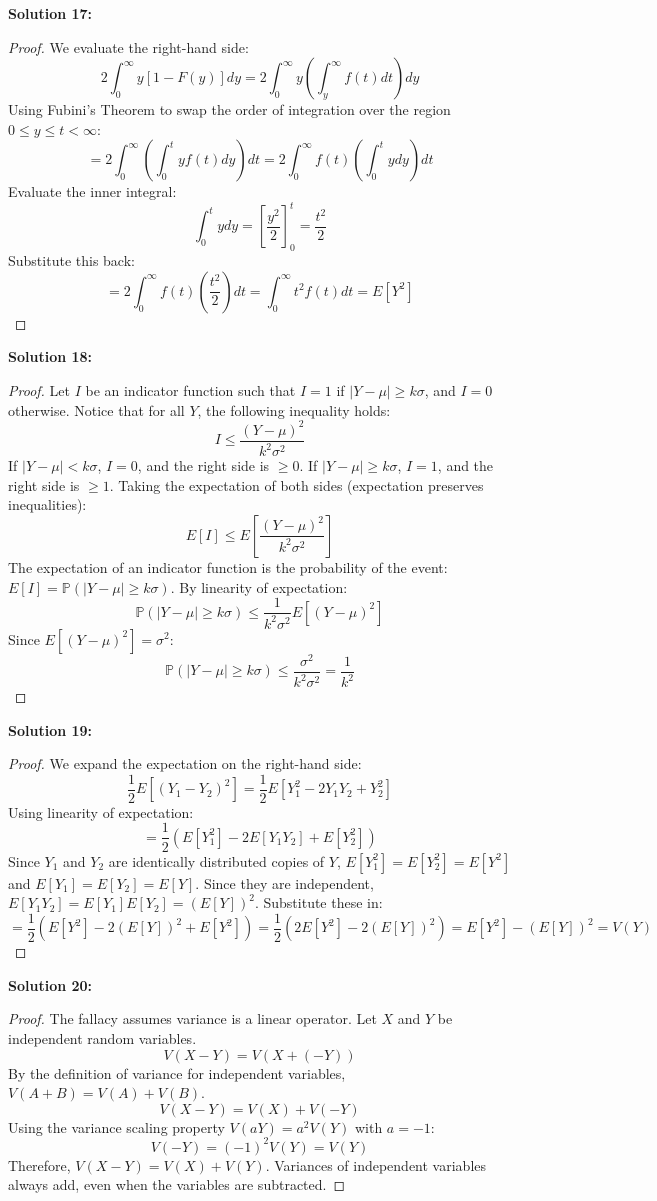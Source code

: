 \documentclass[11pt, a4paper]{article}
\theoremstyle{definition}
\theoremstyle{remark}
\newcommand{\Prob}{\mathbb{P}}
\begin{document}
\textbf{Solution 17:}
\begin{proof}
We evaluate the right-hand side:
\[ 2 \int_0^\infty y [1 - F(y)] dy = 2 \int_0^\infty y \left( \int_y^\infty f(t) dt \right) dy \]
Using Fubini's Theorem to swap the order of integration over the region $0 \le y \le t < \infty$:
\[ = 2 \int_0^\infty \left( \int_0^t y f(t) dy \right) dt = 2 \int_0^\infty f(t) \left( \int_0^t y dy \right) dt \]
Evaluate the inner integral:
\[ \int_0^t y dy = \left[ \frac{y^2}{2} \right]_0^t = \frac{t^2}{2} \]
Substitute this back:
\[ = 2 \int_0^\infty f(t) \left( \frac{t^2}{2} \right) dt = \int_0^\infty t^2 f(t) dt = E[Y^2] \]
\end{proof}

\textbf{Solution 18:}
\begin{proof}
Let $I$ be an indicator function such that $I = 1$ if $|Y-\mu| \ge k\sigma$, and $I = 0$ otherwise.
Notice that for all $Y$, the following inequality holds:
\[ I \le \frac{(Y-\mu)^2}{k^2\sigma^2} \]
If $|Y-\mu| < k\sigma$, $I=0$, and the right side is $\ge 0$. If $|Y-\mu| \ge k\sigma$, $I=1$, and the right side is $\ge 1$.
Taking the expectation of both sides (expectation preserves inequalities):
\[ E[I] \le E\left[ \frac{(Y-\mu)^2}{k^2\sigma^2} \right] \]
The expectation of an indicator function is the probability of the event: $E[I] = \Prob(|Y-\mu| \ge k\sigma)$.
By linearity of expectation:
\[ \Prob(|Y-\mu| \ge k\sigma) \le \frac{1}{k^2\sigma^2} E[(Y-\mu)^2] \]
Since $E[(Y-\mu)^2] = \sigma^2$:
\[ \Prob(|Y-\mu| \ge k\sigma) \le \frac{\sigma^2}{k^2\sigma^2} = \frac{1}{k^2} \]
\end{proof}

\textbf{Solution 19:}
\begin{proof}
We expand the expectation on the right-hand side:
\[ \frac{1}{2} E[(Y_1 - Y_2)^2] = \frac{1}{2} E[Y_1^2 - 2Y_1Y_2 + Y_2^2] \]
Using linearity of expectation:
\[ = \frac{1}{2} \left( E[Y_1^2] - 2E[Y_1Y_2] + E[Y_2^2] \right) \]
Since $Y_1$ and $Y_2$ are identically distributed copies of $Y$, $E[Y_1^2] = E[Y_2^2] = E[Y^2]$ and $E[Y_1] = E[Y_2] = E[Y]$.
Since they are independent, $E[Y_1Y_2] = E[Y_1]E[Y_2] = (E[Y])^2$.
Substitute these in:
\[ = \frac{1}{2} \left( E[Y^2] - 2(E[Y])^2 + E[Y^2] \right) = \frac{1}{2} \left( 2E[Y^2] - 2(E[Y])^2 \right) = E[Y^2] - (E[Y])^2 = V(Y) \]
\end{proof}

\textbf{Solution 20:}
\begin{proof}
The fallacy assumes variance is a linear operator. Let $X$ and $Y$ be independent random variables.
\[ V(X-Y) = V(X + (-Y)) \]
By the definition of variance for independent variables, $V(A+B) = V(A) + V(B)$.
\[ V(X-Y) = V(X) + V(-Y) \]
Using the variance scaling property $V(aY) = a^2V(Y)$ with $a = -1$:
\[ V(-Y) = (-1)^2 V(Y) = V(Y) \]
Therefore, $V(X-Y) = V(X) + V(Y)$. Variances of independent variables always add, even when the variables are subtracted.
\end{proof}
\end{document}
